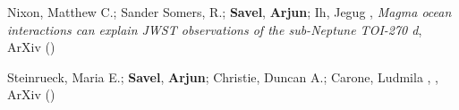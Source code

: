 \item[{\color{numcolor}\scriptsize2}] Nixon, Matthew C.; Sander Somers, R.; \textbf{Savel}, \textbf{Arjun}; Ih, Jegug , \emph{Magma ocean interactions can explain JWST observations of the sub-Neptune TOI-270 d}, ArXiv ()

\item[{\color{numcolor}\scriptsize1}] Steinrueck, Maria E.; \textbf{Savel}, \textbf{Arjun}; Christie, Duncan A.; Carone, Ludmila , , ArXiv ()